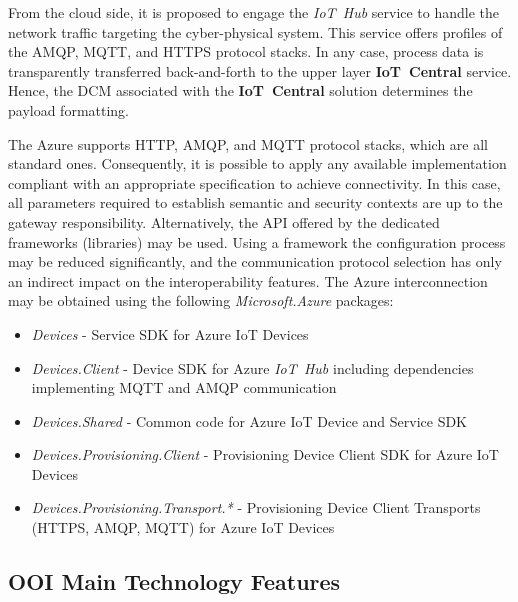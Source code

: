 \documentclass{article}
\begin{document}
From the cloud side, it is proposed to engage the \emph{IoT\ Hub} service to handle the network traffic targeting the cyber-physical system. This service offers profiles of the AMQP, MQTT, and HTTPS protocol stacks. In any case, process data is transparently transferred back-and-forth to the upper layer \textbf{IoT\ Central} service. Hence, the DCM associated with the \textbf{IoT\ Central} solution determines the payload formatting.

The Azure supports HTTP, AMQP, and MQTT protocol stacks, which are all standard ones. Consequently, it is possible to apply any available implementation compliant with an appropriate specification to achieve connectivity. In this case, all parameters required to establish semantic and security contexts are up to the gateway responsibility. Alternatively, the API offered by the dedicated frameworks (libraries) may be used. Using a framework the configuration process may be reduced significantly, and the communication protocol selection has only an indirect impact on the interoperability features. The Azure interconnection may be obtained using the following \emph{Microsoft.Azure} packages:

\begin{itemize}
      \item \emph{Devices} - Service SDK for Azure IoT Devices
      \item \emph{Devices.Client} - Device SDK for Azure \emph{IoT\ Hub} including dependencies implementing MQTT and AMQP communication
      \item \emph{Devices.Shared} - Common code for Azure IoT Device and Service SDK
      \item \emph{Devices.Provisioning.Client} - Provisioning Device Client SDK for Azure IoT Devices
      \item \emph{Devices.Provisioning.Transport.*} - Provisioning Device Client Transports (HTTPS, AMQP, MQTT) for Azure IoT Devices
\end{itemize}

\subsection{OOI Main Technology Features}\label{ooi-main-technology-features}
\end{document}
